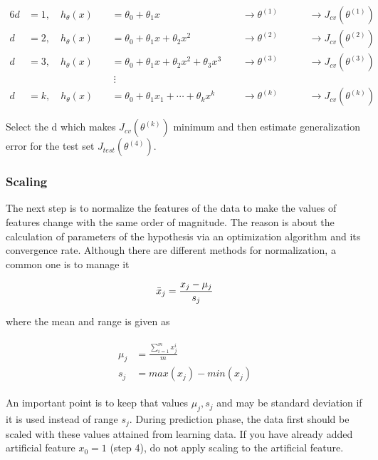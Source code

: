 \begin{alignat*}{6}
\label{eqn:exampCostFunc}
d &= 1, \quad h_{\theta}(x) \ && = \theta_0 + \theta_1 x\ \ && \longrightarrow \theta^{(1)}\ \ && \quad \longrightarrow J_{cv}(\theta^{(1)})\
\\
d &= 2, \quad h_{\theta}(x) \ && = \theta_0 + \theta_1 x + \theta_2 x^2 \ \ && \longrightarrow \theta^{(2)}\ \ && \quad \longrightarrow J_{cv}(\theta^{(2)})\
\\
d &= 3, \quad h_{\theta}(x) \ && = \theta_0 + \theta_1 x + \theta_2 x^2 + \theta_3 x^3\ \ && \longrightarrow \theta^{(3)}\ \ && \quad \longrightarrow J_{cv}(\theta^{(3)})\
\\
& \ &&\ \vdots \ &&\ \ &&\ 
\\
d &= k, \quad h_{\theta}(x) \ && = \theta_0 + \theta_1 x_1 + \cdots+ \theta_k x^k\ \ && \longrightarrow \theta^{(k)}\ \ && \quad \longrightarrow J_{cv}(\theta^{(k)})\
\end{alignat*}

Select the d which makes $J_{cv}(\theta^{(k)})$ minimum and then 
estimate generalization error for the test set $J_{test}(\theta^{(4)})$.

\subsubsection{Scaling}

The next step is to normalize the features of the data to make the 
values of features change with the same order of magnitude. 
The reason is about the calculation of parameters of the hypothesis 
via an optimization algorithm and its convergence rate.  
Although there are different methods for normalization, a common one is to manage it

\begin{equation}{\label{eqn:scalingFeatures}}
\bar{x}_j = \frac{x_j - \mu_j}{s_j} 
\end{equation} 

where the mean and range is given as

\begin{align}
\label{eqn:meandAndRange}
\begin{split}
\mu_j & = \frac{\sum\limits_{i=1}^m {x_j^i} }{m}
\\
s_j & = max(x_j) - min(x_j)
\end{split}
\end{align}

An important point is to keep that values $\mu_j, s_j$ and may be standard 
deviation if it is used instead of range $s_j$. During prediction phase,
the data first should be scaled with these values attained from learning data.
If you have already added artificial feature  $x_0 = 1$ (step 4), 
do not apply scaling to the artificial feature.

